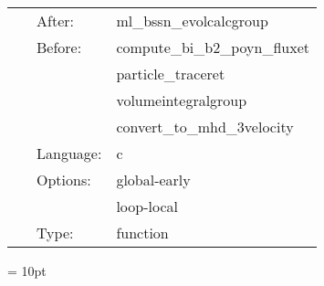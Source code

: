  \begin{tabular*}{160mm}{cll} 
~ & After:  & ml\_bssn\_evolcalcgroup \\ 
~ & Before:  & compute\_bi\_b2\_poyn\_fluxet \\ 
~& ~ &particle\_traceret\\ 
~& ~ &volumeintegralgroup\\ 
~& ~ &convert\_to\_mhd\_3velocity\\ 
~ & Language:  & c \\ 
~ & Options:  & global-early \\ 
~& ~ &loop-local\\ 
~ & Type:  & function \\ 
\end{tabular*} 



\vspace{5mm}\parskip = 10pt 
